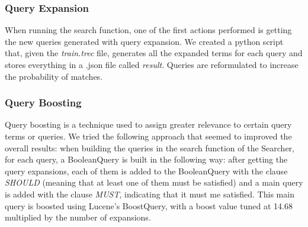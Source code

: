 \subsubsection{Query Expansion}
When running the search function, one of the first actions performed is getting the new queries generated with query expansion.
We created a python script that, given the \textit{train.trec} file, generates all the expanded terms for each query and stores everything in a .json file called \textit{result}.
\newline
Queries are reformulated to increase the probability of matches.


\subsubsection{Query Boosting}
Query boosting is a technique used to assign greater relevance to certain query terms or queries.\newline
We tried the following approach that seemed to improved the overall results: when building the queries in the search function of the Searcher, for each query, a BooleanQuery is built in the following way: after getting the query expansions, each of them is added to the BooleanQuery with the clause \textit{SHOULD} (meaning that at least one of them must be satisfied) and a main query is added with the clause \textit{MUST}, indicating that it must me satisfied. This main query is boosted using Lucene's BoostQuery, with a boost value tuned at 14.68 multiplied by the number of expansions.